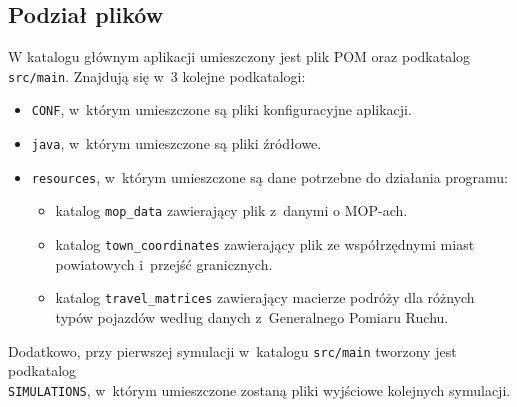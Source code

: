 \subsection{Podział plików}
W katalogu głównym aplikacji umieszczony jest plik POM oraz podkatalog \texttt{src/main}. Znajdują się w~3 kolejne podkatalogi:
\begin{itemize}
\item \texttt{CONF}, w~którym umieszczone są pliki konfiguracyjne aplikacji.
\item \texttt{java}, w~którym umieszczone są pliki źródłowe.
\item \texttt{resources}, w~którym umieszczone są dane potrzebne do działania programu:
    \begin{itemize}
        \item katalog \texttt{mop\_data} zawierający plik z~danymi o MOP-ach.
        \item katalog \texttt{town\_coordinates} zawierający plik ze współrzędnymi miast powiatowych i~przejść granicznych.
        \item katalog \texttt{travel\_matrices} zawierający macierze podróży dla różnych typów pojazdów według danych z~Generalnego Pomiaru Ruchu.
    \end{itemize}
\end{itemize}
Dodatkowo, przy pierwszej symulacji w~katalogu \texttt{src/main} tworzony jest podkatalog \\\texttt{SIMULATIONS}, w~którym umieszczone zostaną pliki wyjściowe kolejnych symulacji.

